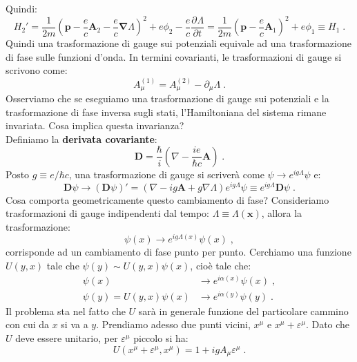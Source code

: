 \documentclass[10pt,a4paper]{report}
\theoremstyle{definition}
\newcommand{\pdev}[3][]{\frac{\partial^{#1} #2}{\partial #3^{#1}}}
\numberwithin{equation}{section}
\newcommand{\bnabla}{\boldsymbol{\nabla}}
\begin{document}
Quindi:
\begin{equation}
H_2'=\frac{1}{2m}\left(\mathbf{p}-\frac{e}{c}\mathbf{A}_2-\frac{e}{c}\bnabla\Lambda\right)^2+e\phi_2-\frac{e}{c}\pdev{\Lambda}{t}=\frac{1}{2m}\left(\mathbf{p}-\frac{e}{c}\mathbf{A}_1\right)^2+e\phi_1\equiv H_1\;.
\end{equation}
Quindi una trasformazione di gauge sui potenziali equivale ad una trasformazione di fase sulle funzioni d'onda. In termini covarianti, le trasformazioni di gauge si scrivono come:
\begin{equation}
A_{\mu}^{(1)}=A_{\mu}^{(2)}-\partial_{\mu}\Lambda\;.
\end{equation}
Osserviamo che se eseguiamo una trasformazione di gauge sui potenziali e la trasformazione di fase inversa sugli stati, l'Hamiltoniana del sistema rimane invariata. Cosa implica questa invarianza? \\
Definiamo la \textbf{derivata covariante}:
\begin{equation}
\mathbf{D}=\frac{\hbar}{i}\left(\nabla-\frac{ie}{\hbar c}\mathbf{A}\right)\;.
\end{equation}
Posto $g\equiv e/\hbar c$, una trasformazione di gauge si scriverà come $\psi\to e^{ig\Lambda}\psi$ e:
\begin{equation}
\mathbf{D}\psi\longrightarrow (\mathbf{D}\psi)'=(\nabla-ig\mathbf{A}+g\nabla\Lambda)e^{ig\Lambda}\psi\equiv e^{ig\Lambda}\mathbf{D}\psi\;.
\end{equation}
Cosa comporta geometricamente questo cambiamento di fase? Consideriamo trasformazioni di gauge indipendenti dal tempo: $\Lambda\equiv\Lambda(\mathbf{x})$, allora la trasformazione:
\begin{equation}
\psi(x)\longrightarrow e^{ig\Lambda(x)}\psi(x)\;,
\end{equation}
corrisponde ad un cambiamento di fase punto per punto. Cerchiamo una funzione $U(y,x)$ tale che $\psi(y)\sim U(y,x)\psi(x)$, cioè tale che:
\begin{align*}
\psi(x) &\longrightarrow e^{i\alpha(x)}\psi(x)\;, \\
\psi(y)=U(y,x)\psi(x) &\longrightarrow e^{i\alpha(y)}\psi(y)\;.
\end{align*}
Il problema sta nel fatto che $U$ sarà in generale funzione del particolare cammino con cui da $x$ si va a $y$. Prendiamo adesso due punti vicini, $x^{\mu}$ e $x^{\mu}+\varepsilon^{\mu}$. Dato che $U$ deve essere unitario, per $\varepsilon^{\mu}$ piccolo si ha:
\begin{equation}
U(x^{\mu}+\varepsilon^{\mu},x^{\mu})=1+igA_{\mu}\varepsilon^{\mu}\;.
\end{equation}
\end{document}
